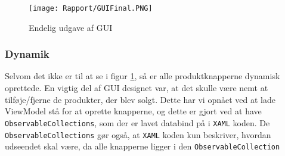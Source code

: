 \begin{figure}[H]
\centering
	\texttt{[image: Rapport/GUIFinal.PNG]}
	\caption{Endelig udgave af GUI}
	\label{fig:GUIFinal}
\end{figure}

\subsubsection{Dynamik}
Selvom det ikke er til at se i figur \ref{fig:GUIFinal}, så er alle produktknapperne dynamisk oprettede. 
En vigtig del af GUI designet var, at det skulle være nemt at tilføje/fjerne de produkter, der blev solgt.
Dette har vi opnået ved at lade ViewModel stå for at oprette knapperne, og dette er gjort ved at have \texttt{ObservableCollections}, som der er lavet databind på i \texttt{XAML} koden.
De \texttt{ObservableCollections} gør også, at \texttt{XAML} koden kun beskriver, hvordan udseendet skal være, da alle knapperne ligger i den \texttt{ObservableCollection}
